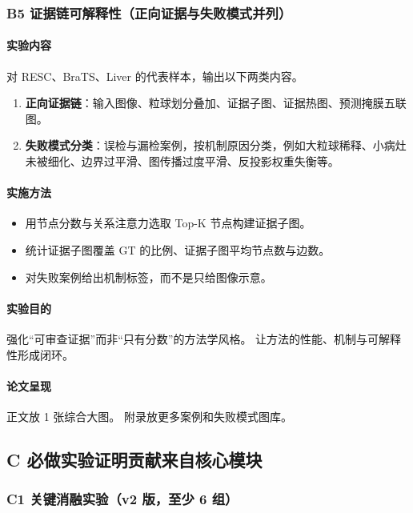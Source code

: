 \documentclass[UTF8,a4paper]{ctexart}
\begin{document}
\subsubsection{B5 证据链可解释性（正向证据与失败模式并列）}

\paragraph{实验内容}
对 RESC、BraTS、Liver 的代表样本，输出以下两类内容。
\begin{enumerate}
  \item \textbf{正向证据链}：输入图像、粒球划分叠加、证据子图、证据热图、预测掩膜五联图。
  \item \textbf{失败模式分类}：误检与漏检案例，按机制原因分类，例如大粒球稀释、小病灶未被细化、边界过平滑、图传播过度平滑、反投影权重失衡等。
\end{enumerate}

\paragraph{实施方法}
\begin{itemize}
  \item 用节点分数与关系注意力选取 Top-K 节点构建证据子图。
  \item 统计证据子图覆盖 GT 的比例、证据子图平均节点数与边数。
  \item 对失败案例给出机制标签，而不是只给图像示意。
\end{itemize}

\paragraph{实验目的}
强化“可审查证据”而非“只有分数”的方法学风格。
让方法的性能、机制与可解释性形成闭环。

\paragraph{论文呈现}
正文放 1 张综合大图。
附录放更多案例和失败模式图库。

\subsection{C 必做实验\quad 证明贡献来自核心模块}

\subsubsection{C1 关键消融实验（v2 版，至少 6 组）}
\end{document}
